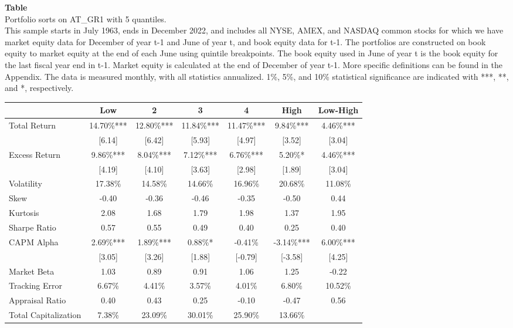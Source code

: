 \begin{table*}[ht!]
\raggedright
{}
\label{tab: quantile_sortAT_GR1_with_5_quantiles}
\textbf{Table \thetable} \\
Portfolio sorts on AT\_GR1 with 5 quantiles. \\
\hspace*{1em}This sample starts in July 1963, ends in December 2022, and includes all NYSE, AMEX, and NASDAQ common stocks for which we have market equity data for December of year t-1 and June of year t, and book equity data for t-1. The portfolios are constructed on book equity to market equity at the end of each June using quintile breakpoints.  The book equity used in June of year t is the book equity for the last fiscal year end in t-1.  Market equity is calculated at the end of December of year t-1.  More specific definitions can be found in the Appendix.  The data is measured monthly, with all statistics annualized.  1\%, 5\%, and 10\% statistical significance are indicated with ***, **, and *, respectively. \\
\vspace{0.5em}
\centering
\begin{adjustbox}{max width=\textwidth}
\begin{tabular}{@{}lcccccc@{}}
\toprule
 & Low & 2 & 3 & 4 & High & Low-High \\
\midrule
Total Return & 14.70\%*** & 12.80\%*** & 11.84\%*** & 11.47\%*** & 9.84\%*** & 4.46\%*** \\
 & [6.14] & [6.42] & [5.93] & [4.97] & [3.52] & [3.04] \\
Excess Return & 9.86\%*** & 8.04\%*** & 7.12\%*** & 6.76\%*** & 5.20\%* & 4.46\%*** \\
 & [4.19] & [4.10] & [3.63] & [2.98] & [1.89] & [3.04] \\
Volatility & 17.38\% & 14.58\% & 14.66\% & 16.96\% & 20.68\% & 11.08\% \\
Skew & -0.40 & -0.36 & -0.46 & -0.35 & -0.50 & 0.44 \\
Kurtosis & 2.08 & 1.68 & 1.79 & 1.98 & 1.37 & 1.95 \\
Sharpe Ratio & 0.57 & 0.55 & 0.49 & 0.40 & 0.25 & 0.40 \\
CAPM Alpha & 2.69\%*** & 1.89\%*** & 0.88\%* & -0.41\% & -3.14\%*** & 6.00\%*** \\
 & [3.05] & [3.26] & [1.88] & [-0.79] & [-3.58] & [4.25] \\
Market Beta & 1.03 & 0.89 & 0.91 & 1.06 & 1.25 & -0.22 \\
Tracking Error & 6.67\% & 4.41\% & 3.57\% & 4.01\% & 6.80\% & 10.52\% \\
Appraisal Ratio & 0.40 & 0.43 & 0.25 & -0.10 & -0.47 & 0.56 \\
Total Capitalization & 7.38\% & 23.09\% & 30.01\% & 25.90\% & 13.66\% &  \\
\bottomrule
\end{tabular}
\end{adjustbox}
\end{table*}